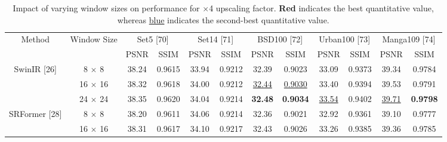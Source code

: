 \documentclass[twocolumn]{svjour3}          %
\begin{document}
\begin{table}
\centering
\caption{Impact of varying window sizes on performance for $\times$4 upscaling factor. {\color{red}\textbf{Red}} indicates the best quantitative value, whereas {\color{blue}\underline{blue}} indicates the second-best quantitative value.}
\label{table3}
\setlength{\tabcolsep}{3pt}

\begin{tabular}{|c|c|cc|cc|cc|cc|cc|}
  \hline
  \multirow{2}{*}{Method} & \multirow{2}{*}{Window Size} & \multicolumn{2}{c|}{Set5 [70]} & \multicolumn{2}{c|}{Set14 [71]} & \multicolumn{2}{c|}{BSD100 [72]} & \multicolumn{2}{c|}{Urban100 [73]} & \multicolumn{2}{c|}{Manga109 [74]}   \\
  
\cline{3-12} && \multicolumn{1}{c|}{PSNR}  & SSIM & \multicolumn{1}{c|}{PSNR}  & SSIM  & \multicolumn{1}{c|}{PSNR}  & SSIM  & \multicolumn{1}{c|}{PSNR}  & SSIM & \multicolumn{1}{c|}{PSNR}  & SSIM \\
 \hline
  \multirow{3}{*}{SwinIR [26]} & {8 $\times$ 8}  & \multicolumn{1}{c|}{38.24} &{0.9615}  & \multicolumn{1}{c|}{33.94} &{0.9212} & \multicolumn{1}{c|}{32.39} &{0.9023} & \multicolumn{1}{c|}{33.09} &{0.9373}  & \multicolumn{1}{c|}{39.34} &{0.9784} \\
            & {16 $\times$ 16}   & \multicolumn{1}{c|}{38.32} &{0.9618}  & \multicolumn{1}{c|}{34.00} &{0.9212} & \multicolumn{1}{c|}{\color{blue}\underline{32.44}} &{\color{blue}\underline{0.9030}} & \multicolumn{1}{c|}{33.40} &{0.9394}  & \multicolumn{1}{c|}{39.53} &{0.9791} \\
            & {24 $\times$ 24} & \multicolumn{1}{c|}{38.35} &{0.9620}  & \multicolumn{1}{c|}{34.04} &{0.9214} & \multicolumn{1}{c|}{\color{red}\textbf{32.48}} &{\color{red}\textbf{0.9034}} & \multicolumn{1}{c|}{\color{blue}\underline{33.54}} &{0.9402}  & \multicolumn{1}{c|}{\color{blue}\underline{39.71}} &{\color{red}\textbf{0.9798}}  \\
  \hline
  \multirow{3}{*}{SRFormer [28]} & {8 $\times$ 8}  & \multicolumn{1}{c|}{38.20} &{0.9611}  & \multicolumn{1}{c|}{34.06} &{0.9214} & \multicolumn{1}{c|}{32.36} &{0.9021} & \multicolumn{1}{c|}{32.92} &{0.9361}  & \multicolumn{1}{c|}{39.10} &{0.9777} \\
            & {16 $\times$ 16}   & \multicolumn{1}{c|}{38.31} &{0.9617}  & \multicolumn{1}{c|}{34.10} &{0.9217} & \multicolumn{1}{c|}{32.43} &{0.9026} & \multicolumn{1}{c|}{33.26} &{0.9385}  & \multicolumn{1}{c|}{39.36} &{0.9785} \\

\end{tabular}
\end{table}
\end{document}
